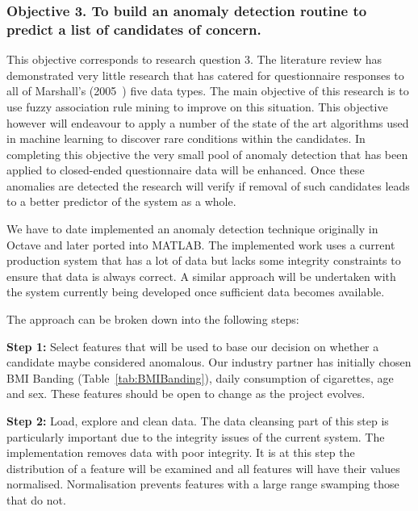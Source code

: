 \subsubsection{Objective 3. To build an anomaly detection routine to predict a list of candidates of concern.}

This objective corresponds to research question 3. The literature review has demonstrated very little research that has catered for questionnaire responses to all of Marshall's (2005~\cite{marshall2005purpose}) five data types. The main objective of this research is to use fuzzy association rule mining to improve on this situation. This objective however will endeavour to apply a number of the state of the art algorithms used in machine learning to discover rare conditions within the candidates. In completing this objective the very small pool of anomaly detection that has been applied to closed-ended questionnaire data will be enhanced. Once these anomalies are detected the research will verify if removal of such candidates leads to a better predictor of the system as a whole.


We have to date implemented an anomaly detection technique originally in Octave and later ported into MATLAB. The implemented work uses a current production system that has a lot of data but lacks some integrity constraints to ensure that data is always correct.
A similar approach will be undertaken with the system currently being developed once sufficient data becomes available.

\par
\noindent
The approach can be broken down into the following steps:

\textbf{Step 1:} Select features that will be used to base our decision on whether a candidate maybe considered anomalous. Our industry partner has initially chosen BMI Banding (Table~\ref{tab:BMIBanding}), daily consumption of cigarettes, age and sex. These features should be open to change as the project evolves.



\textbf{Step 2:} Load, explore and clean data. The data cleansing part of this step is particularly important due to the integrity issues of the current system. The implementation removes data with poor integrity. It is at this step the distribution of a feature will be examined and all features will have their values normalised. Normalisation prevents features with a large range swamping those that do not.

